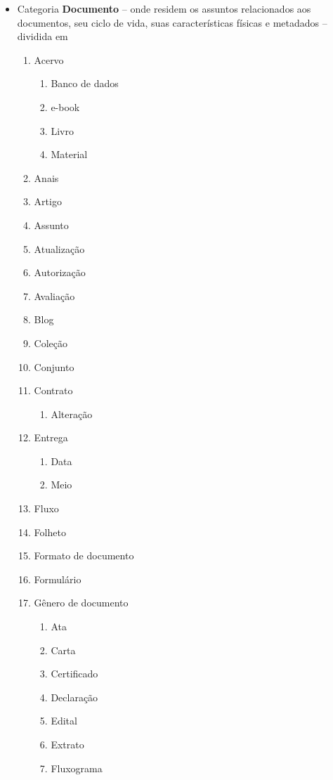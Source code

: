\begin{multicols}{2}
\begin{itemize}
\begin{enumerate}
\end{enumerate}	\item Categoria \textbf{Documento} -- onde residem os assuntos relacionados aos documentos, seu ciclo de vida, suas características físicas e metadados -- dividida em	\begin{enumerate} 	\item Acervo	\begin{enumerate}			
					\item Banco de dados		
					\item e-book		
					\item Livro		
					\item Material	\end{enumerate}	
			\item Anais				
			\item Artigo				
			\item Assunto				
			\item Atualização				
			\item Autorização				
			\item Avaliação				
			\item Blog				
			\item Coleção				
			\item Conjunto				
			\item Contrato	\begin{enumerate}			
					\item Alteração	\end{enumerate}	
			\item Entrega	\begin{enumerate}			
					\item Data		
					\item Meio	\end{enumerate}	
			\item Fluxo				
			\item Folheto				
			\item Formato de documento				
			\item Formulário				
			\item Gênero de documento	\begin{enumerate}	\item Ata		
					\item Carta		
					\item Certificado		
					\item Declaração		
					\item Edital		
					\item Extrato		
					\item Fluxograma		

\end{enumerate}
\end{enumerate}
\end{itemize}
\end{multicols}
